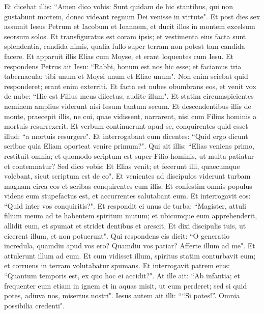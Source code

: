 \begin{biblechapter}  
\verse Et dicebat illis: “Amen dico vobis: Sunt quidam de hic stantibus, qui non gustabunt mortem, donec videant regnum Dei venisse in virtute". 
\verse Et post dies sex assumit Iesus Petrum et Iacobum et Ioannem, et ducit illos in montem excelsum seorsum solos. Et transfiguratus est coram ipsis; 
\verse et vestimenta eius facta sunt splendentia, candida nimis, qualia fullo super terram non potest tam candida facere. 
\verse Et apparuit illis Elias cum Moyse, et erant loquentes cum Iesu. 
\verse Et respondens Petrus ait Iesu: “Rabbi, bonum est nos hic esse; et faciamus tria tabernacula: tibi unum et Moysi unum et Eliae unum".  
\verse Non enim sciebat quid responderet; erant enim exterriti. 
\verse Et facta est nubes obumbrans eos, et venit vox de nube: “Hic est Filius meus dilectus; audite illum". 
\verse Et statim circumspicientes neminem amplius viderunt nisi Iesum tantum secum. 
\verse Et descendentibus illis de monte, praecepit illis, ne cui, quae vidissent, narrarent, nisi cum Filius hominis a mortuis resurrexerit. 
\verse Et verbum continuerunt apud se, conquirentes quid esset illud: “a mortuis resurgere". 
\verse Et interrogabant eum dicentes: “Quid ergo dicunt scribae quia Eliam oporteat venire primum?". 
\verse Qui ait illis: “Elias veniens primo, restituit omnia; et quomodo scriptum est super Filio hominis, ut multa patiatur et contemnatur? 
\verse Sed dico vobis: Et Elias venit; et fecerunt illi, quaecumque volebant, sicut scriptum est de eo". 
\verse Et venientes ad discipulos viderunt turbam magnam circa eos et scribas conquirentes cum illis. 
\verse Et confestim omnis populus videns eum stupefactus est, et accurrentes salutabant eum. 
\verse Et interrogavit eos: “Quid inter vos conquiritis?". 
\verse Et respondit ei unus de turba: “Magister, attuli filium meum ad te habentem spiritum mutum; 
\verse et ubicumque eum apprehenderit, allidit eum, et spumat et stridet dentibus et arescit. Et dixi discipulis tuis, ut eicerent illum, et non potuerunt". 
\verse Qui respondens eis dicit: “O generatio incredula, quamdiu apud vos ero? Quamdiu vos patiar? Afferte illum ad me". 
\verse Et attulerunt illum ad eum. Et cum vidisset illum, spiritus statim conturbavit eum; et corruens in terram volutabatur spumans. 
\verse Et interrogavit patrem eius: “Quantum temporis est, ex quo hoc ei accidit?". At ille ait: “Ab infantia; 
\verse et frequenter eum etiam in ignem et in aquas misit, ut eum perderet; sed si quid potes, adiuva nos, misertus nostri". 
\verse Iesus autem ait illi: ““Si potes!”. Omnia possibilia credenti". 

\end{biblechapter}
